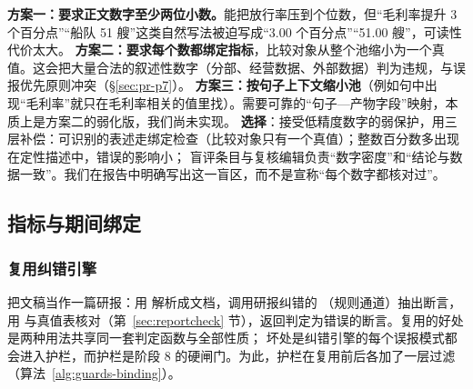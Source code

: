 \begin{tradeoff}[：护栏对低精度数字的弱保护]
\textbf{方案一：要求正文数字至少两位小数。}能把放行率压到个位数，但“毛利率提升 3 个百分点”“船队 51 艘”这类自然写法被迫写成“3.00 个百分点”“51.00 艘”，可读性代价太大。
\textbf{方案二：要求每个数都绑定指标}，比较对象从整个池缩小为一个真值。这会把大量合法的叙述性数字（分部、经营数据、外部数据）判为违规，与误报优先原则冲突（\S\ref{sec:pr-p7}）。
\textbf{方案三：按句子上下文缩小池}（例如句中出现“毛利率”就只在毛利率相关的值里找）。需要可靠的“句子—产物字段”映射，本质上是方案二的弱化版，我们尚未实现。
\textbf{选择}：接受低精度数字的弱保护，用三层补偿：可识别的表述走绑定检查（比较对象只有一个真值）；整数百分数多出现在定性描述中，错误的影响小；
盲评条目与复核编辑负责“数字密度”和“结论与数据一致”。我们在报告中明确写出这一盲区，而不是宣称“每个数字都核对过”。
\end{tradeoff}

\subsection{指标与期间绑定}
\label{sec:guards-binding}

\subsubsection{复用纠错引擎}

 把文稿当作一篇研报：用  解析成文档，调用研报纠错的 （规则通道）抽出断言，
用  与真值表核对（第~\ref{sec:reportcheck} 节），返回判定为错误的断言。复用的好处是两种用法共享同一套判定函数与全部性质；
坏处是纠错引擎的每个误报模式都会进入护栏，而护栏是阶段 8 的硬闸门。为此，护栏在复用前后各加了一层过滤（算法~\ref{alg:guards-binding}）。

